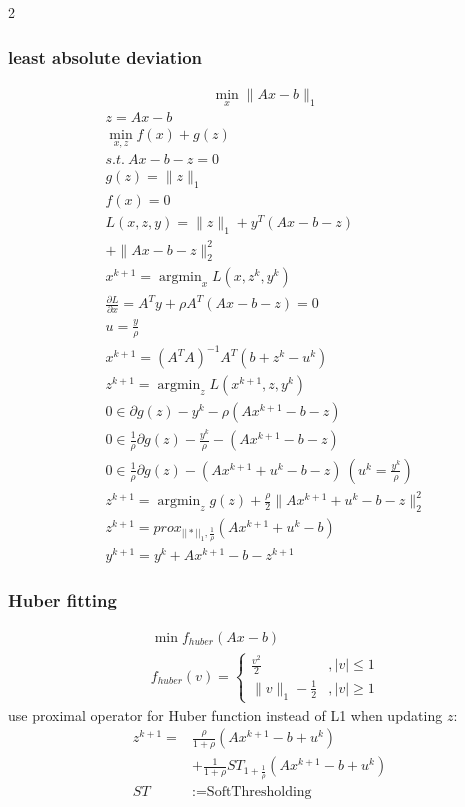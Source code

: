 \documentclass[8pt]{extarticle}
\DeclareMathOperator*{\argmin}{argmin}
\newcommand{\norm}[1]{\|#1\|}
\begin{document}
\begin{multicols*}{2}
  \subsubsection{least absolute deviation}
  \begin{align*}
    &\min_x \norm{Ax-b}_1
  \end{align*}
  \begin{align*}
    &z=Ax-b\\
    &\min_{x,z} f(x) + g(z)\\
    &s.t.\ Ax-b-z=0\\
    &g(z) = \norm{z}_1\\
    &f(x) = 0\\
    &L(x,z,y)=\norm{z}_1 + y^T(Ax-b-z)\\
    &+ \norm{Ax-b-z}_2^2\\
    &x^{k+1}=\argmin_x L(x,z^k,y^k)\\
    &\frac{\partial L}{\partial x}=A^T y + \rho A^T(Ax-b-z)=0\\
    &u=\frac{y}{\rho}\\
    &x^{k+1}=(A^T A)^{-1}A^T(b+z^k-u^k)\\
    &z^{k+1}=\argmin_z L(x^{k+1},z,y^k)\\
    &0 \in \partial g(z) -y^k - \rho(Ax^{k+1}-b-z)\\
    &0 \in \frac{1}{\rho} \partial g(z) -\frac{y^k}{\rho} - (Ax^{k+1}-b-z)\\
    &0 \in \frac{1}{\rho} \partial g(z) - (Ax^{k+1}+u^k-b-z)\ (u^k = \frac{y^k}{\rho})\\
    &z^{k+1} = \argmin_z g(z) + \frac{\rho}{2}\norm{Ax^{k+1}+u^k-b-z}_2^2\\
    &z^{k+1} = prox_{||*||_1, \frac{1}{\rho}}(Ax^{k+1}+u^k-b)\\
    &y^{k+1}=y^k + Ax^{k+1}-b-z^{k+1}
  \end{align*}

  \subsubsection{Huber fitting}
  \begin{align*}
    &\min f_{huber}(Ax-b)\\
    &f_{huber}(v) =
    \begin{cases}
      \frac{v^2}{2} &, |v| \leq 1\\
      \norm{v}_1 - \frac{1}{2} &, |v| \ge 1
    \end{cases}
  \end{align*}
  use proximal operator for Huber function instead of L1 when updating $z$:
  \begin{align*}
    z^{k+1}=&\frac{\rho}{1+\rho}(Ax^{k+1}-b+u^k)\\
            &+\frac{1}{1+\rho}ST_{1+\frac{1}{\rho}}(Ax^{k+1}-b+u^k)\\
    ST &:= \text{SoftThresholding}
  \end{align*}


\end{multicols*}
\end{document}

